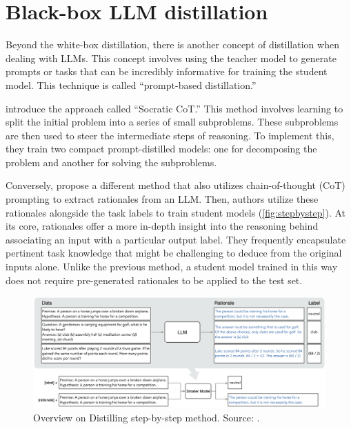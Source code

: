 \section{Black-box LLM distillation}
\label{section:blackbox}

Beyond the white-box distillation, there is another concept of distillation when dealing with LLMs. This concept involves using the teacher model to generate prompts or tasks that can be incredibly informative for training the student model. This technique is called “prompt-based distillation.”

\citeauthor{socraticcot} \cite{socraticcot} introduce the approach called ``Socratic CoT\@.'' This method involves learning to split the initial problem into a series of small subproblems. These subproblems are then used to steer the intermediate steps of reasoning. To implement this, they train two compact prompt-distilled models: one for decomposing the problem and another for solving the subproblems.

Conversely, \citeauthor{stepbystep} \cite{stepbystep} propose a different method that also utilizes chain-of-thought (CoT) \cite{cot} prompting to extract rationales from an LLM\@. Then, authors utilize these rationales alongside the task labels to train student models (\autoref{fig:stepbystep}). At its core, rationales offer a more in-depth insight into the reasoning behind associating an input with a particular output label. They frequently encapsulate pertinent task knowledge that might be challenging to deduce from the original inputs alone. Unlike the previous method, a student model trained in this way does not require pre-generated rationales to be applied to the test set.

\begin{figure}[hbt]
    \centering
    \includegraphics[width=0.99\linewidth]{figs/stepbystep.png}
    \caption{Overview on Distilling step-by-step method. Source: \cite{stepbystep}.}
    \label{fig:stepbystep}
\end{figure}

